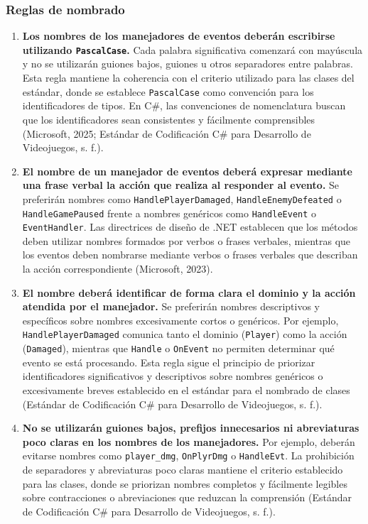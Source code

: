 
\subsubsection{Reglas de nombrado}

\begin{enumerate}

\item \textbf{Los nombres de los manejadores de eventos deberán escribirse utilizando \texttt{PascalCase}.} Cada palabra significativa comenzará con mayúscula y no se utilizarán guiones bajos, guiones u otros separadores entre palabras. Esta regla mantiene la coherencia con el criterio utilizado para las clases del estándar, donde se establece \texttt{PascalCase} como convención para los identificadores de tipos. En C\#, las convenciones de nomenclatura buscan que los identificadores sean consistentes y fácilmente comprensibles (Microsoft, 2025; Estándar de Codificación C\# para Desarrollo de Videojuegos, s. f.).

\item \textbf{El nombre de un manejador de eventos deberá expresar mediante una frase verbal la acción que realiza al responder al evento.} Se preferirán nombres como \texttt{HandlePlayerDamaged}, \texttt{HandleEnemyDefeated} o \texttt{HandleGamePaused} frente a nombres genéricos como \texttt{HandleEvent} o \texttt{EventHandler}. Las directrices de diseño de .NET establecen que los métodos deben utilizar nombres formados por verbos o frases verbales, mientras que los eventos deben nombrarse mediante verbos o frases verbales que describan la acción correspondiente (Microsoft, 2023).

\item \textbf{El nombre deberá identificar de forma clara el dominio y la acción atendida por el manejador.} Se preferirán nombres descriptivos y específicos sobre nombres excesivamente cortos o genéricos. Por ejemplo, \texttt{HandlePlayerDamaged} comunica tanto el dominio (\texttt{Player}) como la acción (\texttt{Damaged}), mientras que \texttt{Handle} o \texttt{OnEvent} no permiten determinar qué evento se está procesando. Esta regla sigue el principio de priorizar identificadores significativos y descriptivos sobre nombres genéricos o excesivamente breves establecido en el estándar para el nombrado de clases (Estándar de Codificación C\# para Desarrollo de Videojuegos, s. f.).

\item \textbf{No se utilizarán guiones bajos, prefijos innecesarios ni abreviaturas poco claras en los nombres de los manejadores.} Por ejemplo, deberán evitarse nombres como \texttt{player\_dmg}, \texttt{OnPlyrDmg} o \texttt{HandleEvt}. La prohibición de separadores y abreviaturas poco claras mantiene el criterio establecido para las clases, donde se priorizan nombres completos y fácilmente legibles sobre contracciones o abreviaciones que reduzcan la comprensión (Estándar de Codificación C\# para Desarrollo de Videojuegos, s. f.).


\end{enumerate}
